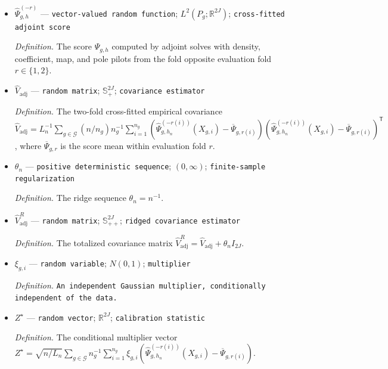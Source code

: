 \documentclass{article}
\begin{document}
\begin{itemize}
  \par\smallskip\noindent\emph{Definition.} The block-diagonal critical covariance \(V(P)=\operatorname{diag}(V_1,\ldots,V_J)\), with \(V_j=w_j\sqrt{\det H(y_j)}H(y_j)/(4\pi f_{T1}(y_j))\) and \(w_j=\alpha(y_j)(\rho_{C0}^{-1}+\rho_{C1}^{-1})+\rho_{T0}^{-1}+\rho_{T1}^{-1}\).
  \item \(\widehat\Psi_{g,h}^{(-r)}\) --- \texttt{vector-\allowbreak{}valued random function}; \(L^2(P_g;\mathbb R^{2J})\); \texttt{cross-\allowbreak{}fitted adjoint score}
  \par\smallskip\noindent\emph{Definition.} The score \(\Psi_{g,h}\) computed by adjoint solves with density, coefficient, map, and pole pilots from the fold opposite evaluation fold \(r\in\{1,2\}\).
  \item \(\widehat V_{\mathrm{adj}}\) --- \texttt{random matrix}; \(\mathbb S_+^{2J}\); \texttt{covariance estimator}
  \par\smallskip\noindent\emph{Definition.} The two-fold cross-fitted empirical covariance \(\widehat V_{\mathrm{adj}}=L_n^{-1}\sum_{g\in\mathcal G}(n/n_g)n_g^{-1}\sum_{i=1}^{n_g}(\widehat\Psi_{g,h_n}^{(-r(i))}(X_{g,i})-\overline\Psi_{g,r(i)})(\widehat\Psi_{g,h_n}^{(-r(i))}(X_{g,i})-\overline\Psi_{g,r(i)})^{\mathsf T}\), where \(\overline\Psi_{g,r}\) is the score mean within evaluation fold \(r\).
  \item \(\theta_n\) --- \texttt{positive deterministic sequence}; \((0,\infty)\); \texttt{finite-\allowbreak{}sample regularization}
  \par\smallskip\noindent\emph{Definition.} The ridge sequence \(\theta_n=n^{-1}\).
  \item \(\widehat V_{\mathrm{adj}}^{R}\) --- \texttt{random matrix}; \(\mathbb S_{++}^{2J}\); \texttt{ridged covariance estimator}
  \par\smallskip\noindent\emph{Definition.} The totalized covariance matrix \(\widehat V_{\mathrm{adj}}^{R}=\widehat V_{\mathrm{adj}}+\theta_n I_{2J}\).
  \item \(\xi_{g,i}\) --- \texttt{random variable}; \(N(0,1)\); \texttt{multiplier}
  \par\smallskip\noindent\emph{Definition.} \texttt{An independent Gaussian multiplier,\allowbreak{} conditionally independent of the data.}
  \item \(Z^\star\) --- \texttt{random vector}; \(\mathbb R^{2J}\); \texttt{calibration statistic}
  \par\smallskip\noindent\emph{Definition.} The conditional multiplier vector \(Z^\star=\sqrt{n/L_n}\sum_{g\in\mathcal G}n_g^{-1}\sum_{i=1}^{n_g}\xi_{g,i}(\widehat\Psi_{g,h_n}^{(-r(i))}(X_{g,i})-\overline\Psi_{g,r(i)})\).

\end{itemize}
\end{document}
